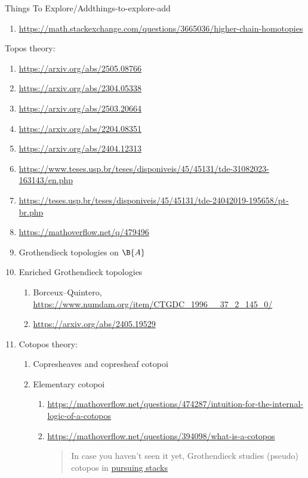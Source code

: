 \begin{remark}{Things To Explore/Add}{things-to-explore-add}
\begin{enumerate}
        \item \url{https://math.stackexchange.com/questions/3665036/higher-chain-homotopies}
    \end{enumerate}
    Topos theory:
    \begin{enumerate}
        \item \url{https://arxiv.org/abs/2505.08766}
        \item \url{https://arxiv.org/abs/2304.05338}
        \item \url{https://arxiv.org/abs/2503.20664}
        \item \url{https://arxiv.org/abs/2204.08351}
        \item \url{https://arxiv.org/abs/2404.12313}
        \item \url{https://www.teses.usp.br/teses/disponiveis/45/45131/tde-31082023-163143/en.php}
        \item \url{https://teses.usp.br/teses/disponiveis/45/45131/tde-24042019-195658/pt-br.php}
        \item \url{https://mathoverflow.net/q/479496}
        \item Grothendieck topologies on $\B{A}$
        \item Enriched Grothendieck topologies
            \begin{enumerate}
                \item Borceux--Quintero, \url{https://www.numdam.org/item/CTGDC_1996__37_2_145_0/}
                \item \url{https://arxiv.org/abs/2405.19529}
            \end{enumerate}
        \item Cotopos theory:
            \begin{enumerate}
                \item Copresheaves and copresheaf cotopoi
                \item Elementary cotopoi
                    \begin{enumerate}
                        \item \url{https://mathoverflow.net/questions/474287/intuition-for-the-internal-logic-of-a-cotopos}
                        \item \url{https://mathoverflow.net/questions/394098/what-is-a-cotopos}
                            \begin{quote}
                                In case you haven’t seen it yet, Grothendieck studies (pseudo) cotopos in \href{n case you haven’t seen it yet, Grothendieck studies (pseudo) cotopos in pursuing stacks}{pursuing stacks}

\end{quote}
\end{enumerate}
\end{enumerate}
\end{enumerate}
\end{remark}
